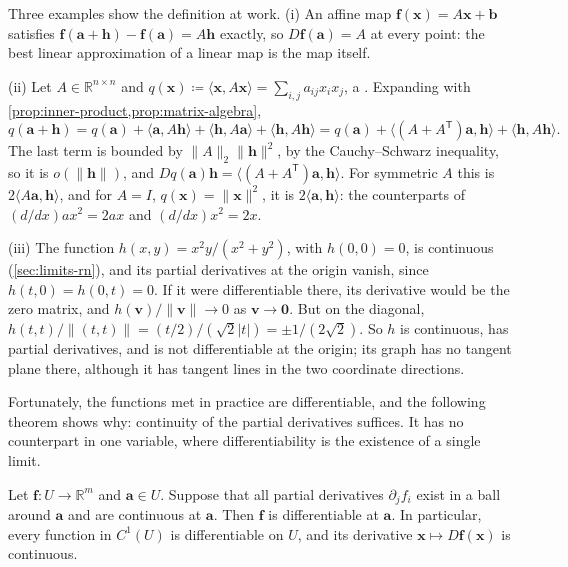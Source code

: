 Three examples show the definition at work. (i) An affine map $\mathbf f(\mathbf x)=A\mathbf x+\mathbf b$ satisfies $\mathbf f(\mathbf a+\mathbf h)-\mathbf f(\mathbf a)=A\mathbf h$ exactly, so $D\mathbf f(\mathbf a)=A$ at every point: the best linear approximation of a linear map is the map itself.

(ii) Let $A\in\mathbb R^{n\times n}$ and $q(\mathbf x)\coloneqq\langle\mathbf x,A\mathbf x\rangle=\sum_{i,j}a_{ij}x_ix_j$, a . Expanding with \cref{prop:inner-product,prop:matrix-algebra},
\[
q(\mathbf a+\mathbf h)=q(\mathbf a)+\langle\mathbf a,A\mathbf h\rangle+\langle\mathbf h,A\mathbf a\rangle+\langle\mathbf h,A\mathbf h\rangle=q(\mathbf a)+\langle(A+A^{\mathsf T})\mathbf a,\mathbf h\rangle+\langle\mathbf h,A\mathbf h\rangle .
\]
The last term is bounded by $\|A\|_2\|\mathbf h\|^2$, by the Cauchy--Schwarz inequality, so it is $o(\|\mathbf h\|)$, and $Dq(\mathbf a)\mathbf h=\langle(A+A^{\mathsf T})\mathbf a,\mathbf h\rangle$. For symmetric $A$ this is $2\langle A\mathbf a,\mathbf h\rangle$, and for $A=I$, $q(\mathbf x)=\|\mathbf x\|^2$, it is $2\langle\mathbf a,\mathbf h\rangle$: the counterparts of $(d/dx)ax^2=2ax$ and $(d/dx)x^2=2x$.

(iii) The function $h(x,y)=x^2y/(x^2+y^2)$, with $h(0,0)=0$, is continuous (\cref{sec:limits-rn}), and its partial derivatives at the origin vanish, since $h(t,0)=h(0,t)=0$. If it were differentiable there, its derivative would be the zero matrix, and $h(\mathbf v)/\|\mathbf v\|\to0$ as $\mathbf v\to\mathbf0$. But on the diagonal, $h(t,t)/\|(t,t)\|=(t/2)/(\sqrt2|t|)=\pm1/(2\sqrt2)$. So $h$ is continuous, has partial derivatives, and is not differentiable at the origin; its graph has no tangent plane there, although it has tangent lines in the two coordinate directions.

Fortunately, the functions met in practice are differentiable, and the following theorem shows why: continuity of the partial derivatives suffices. It has no counterpart in one variable, where differentiability is the existence of a single limit.

\begin{theorem}
\label{thm:c1-differentiable}
Let $\mathbf f\colon U\to\mathbb R^m$ and $\mathbf a\in U$. Suppose that all partial derivatives $\partial_jf_i$ exist in a ball around $\mathbf a$ and are continuous at $\mathbf a$. Then $\mathbf f$ is differentiable at $\mathbf a$. In particular, every function in $C^1(U)$ is differentiable on $U$, and its derivative $\mathbf x\mapsto D\mathbf f(\mathbf x)$ is continuous.
\end{theorem}

